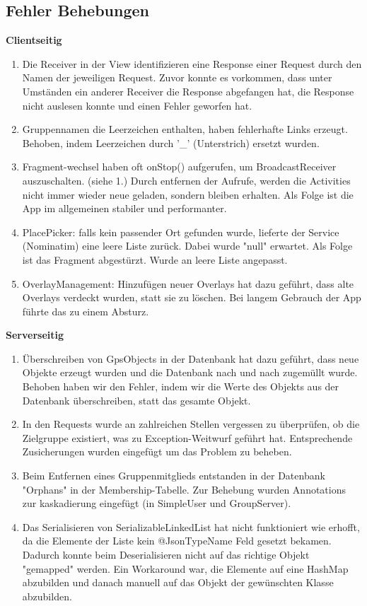 \subsection{Fehler Behebungen}
	\textbf{Clientseitig}
	\begin{enumerate}
		\item Die Receiver in der View identifizieren eine Response einer Request durch den Namen der jeweiligen Request. Zuvor konnte es vorkommen, dass unter Umständen ein anderer Receiver die Response abgefangen hat, die Response nicht auslesen konnte und einen Fehler geworfen hat.
          \item Gruppennamen die Leerzeichen enthalten, haben fehlerhafte Links erzeugt. Behoben, indem Leerzeichen durch '\_' (Unterstrich) ersetzt wurden.
          \item Fragment-wechsel haben oft onStop() aufgerufen, um BroadcastReceiver auszuschalten. (siehe 1.) Durch entfernen der Aufrufe, werden die Activities nicht immer wieder neue geladen, sondern bleiben erhalten. Als Folge ist die App im allgemeinen stabiler und performanter.
          \item PlacePicker: falls kein passender Ort gefunden wurde, lieferte der Service (Nominatim) eine leere Liste zurück. Dabei wurde "null" erwartet. Als Folge ist das Fragment abgestürzt. Wurde an leere Liste angepasst.
          \item OverlayManagement: Hinzufügen neuer Overlays hat dazu geführt, dass alte Overlays verdeckt wurden, statt sie zu löschen. Bei langem Gebrauch der App führte das zu einem Absturz.
	\end{enumerate}

	\textbf{Serverseitig}
	\begin{enumerate}
		\item Überschreiben von GpsObjects in der Datenbank hat dazu geführt, dass neue Objekte erzeugt wurden und die Datenbank nach und nach zugemüllt wurde. Behoben haben wir den Fehler, indem wir die Werte des Objekts aus der Datenbank überschreiben, statt das gesamte Objekt.
		\item In den Requests wurde an zahlreichen Stellen vergessen zu überprüfen, ob die Zielgruppe existiert, was zu Exception-Weitwurf geführt hat. Entsprechende Zusicherungen wurden eingefügt um das Problem zu beheben.
          \item Beim Entfernen eines Gruppenmitglieds entstanden in der Datenbank "Orphans" in der Membership-Tabelle. Zur Behebung wurden Annotations zur kaskadierung eingefügt (in SimpleUser und GroupServer).
		\item Das Serialisieren von SerializableLinkedList hat nicht funktioniert wie erhofft, da die Elemente der Liste kein @JsonTypeName Feld gesetzt bekamen. Dadurch konnte beim Deserialisieren nicht auf das richtige Objekt "gemapped" werden. Ein Workaround war, die Elemente auf eine HashMap abzubilden und danach manuell auf das Objekt der gewünschten Klasse abzubilden.
	\end{enumerate}

